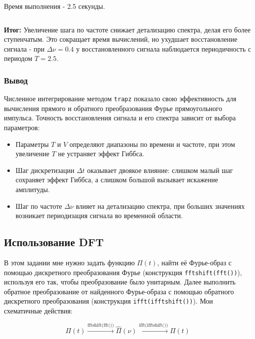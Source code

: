 \documentclass[a4paper,12pt]{article}
\begin{document}
Время выполнения - 2.5 секунды.

\[\]

\textbf{Итог: } Увеличение шага по частоте снижает детализацию спектра, делая его более ступенчатым. Это сокращает время вычислений, но ухудшает восстановление сигнала - при \(\Delta \nu = 0.4\) у восстановленного сигнала наблюдается периодичность с периодом \(T = 2.5\).

\subsubsection{Вывод}

Численное интегрирование методом \texttt{trapz} показало свою эффективность для вычисления прямого и обратного преобразования Фурье прямоугольного импульса. Точность восстановления сигнала и его спектра зависит от выбора параметров:

\begin{itemize}

\item Параметры \(T\) и \(V\) определяют диапазоны по времени и частоте, при этом увеличение \(T\) не устраняет эффект Гиббса.


\item Шаг дискретизации \(\Delta t\) оказывает двоякое влияние: слишком малый шаг сохраняет эффект Гиббса, а слишком большой вызывает искажение амплитуды.

\item Шаг по частоте \(\Delta \nu\) влияет на детализацию спектра, при больших значениях возникает периодизация сигнала во временной области.

\end{itemize}

\newpage

\subsection{Использование DFT}

В этом задании мне нужно задать функцию \(\Pi(t)\), найти её Фурье-образ с помощью дискретного преобразования Фурье (конструкция \texttt{fftshift(fft())}), используя его так, чтобы преобразование было унитарным. Далее выполнить обратное преобразование от найденного Фурье-образа с помощью обратного дискретного преобразования (конструкция \texttt{ifft(ifftshift())}). Мои схематичные действия: 

\[
\Pi(t) \xrightarrow{\text{fftshift(fft())}} \hat{\Pi}(\nu) \xrightarrow{\text{ifft(ifftshift())}} \Pi(t)
\]
\end{document}
